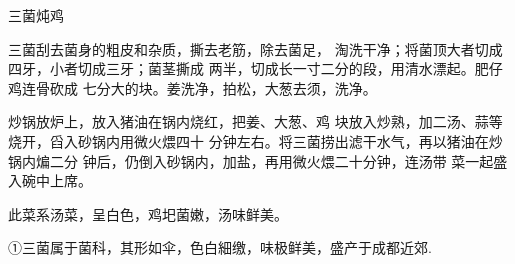 \begin{recipe}{三菌炖鸡}

\ingredients


\cooking

\step 	三菌刮去菌身的粗皮和杂质，撕去老筋，除去菌足， 淘洗干净；将菌顶大者切成四牙，小者切成三牙；菌茎撕成 两半，切成长一寸二分的段，用清水漂起。肥仔鸡连骨砍成 七分大的块。姜洗净，拍松，大葱去须，洗净。

\step 	炒锅放炉上，放入猪油在锅内烧红，把姜、大葱、鸡 块放入炒熟，加二汤、蒜等烧开，舀入砂锅内用微火煨四十 分钟左右。将三菌捞出滤干水气，再以猪油在炒锅内煸二分 钟后，仍倒入砂锅内，加盐，再用微火煨二十分钟，连汤带 菜一起盛入碗中上席。

\notes

此菜系汤菜，呈白色，鸡圯菌嫩，汤味鲜美。

①三菌属于菌科，其形如伞，色白細缴，味极鲜美，盛产于成都近郊.

\end{recipe}

